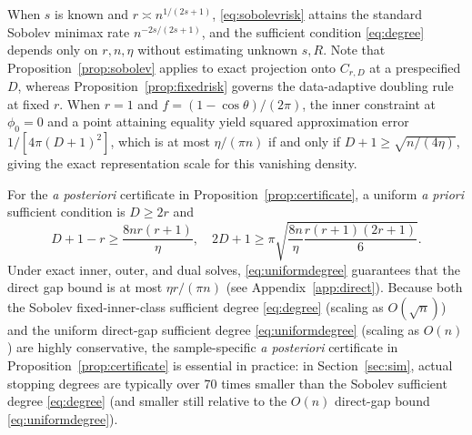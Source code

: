 When \(s\) is known and \(r\asymp n^{1/(2s+1)}\), \eqref{eq:sobolevrisk} attains the standard Sobolev minimax rate \(n^{-2s/(2s+1)}\), and the sufficient condition \eqref{eq:degree} depends only on \(r,n,\eta\) without estimating unknown \(s,R\). Note that Proposition~\ref{prop:sobolev} applies to exact projection onto \(C_{r,D}\) at a prespecified \(D\), whereas Proposition~\ref{prop:fixedrisk} governs the data-adaptive doubling rule at fixed \(r\). When \(r=1\) and \(f=(1-\cos\theta)/(2\pi)\), the inner constraint at \(\phi_0=0\) and a point attaining equality yield squared approximation error \(1/[4\pi(D+1)^2]\), which is at most \(\eta/(\pi n)\) if and only if \(D+1\ge\sqrt{n/(4\eta)}\), giving the exact representation scale for this vanishing density.

For the \emph{a posteriori} certificate in Proposition~\ref{prop:certificate}, a uniform \emph{a priori} sufficient condition is \(D\ge2r\) and
\begin{equation}\label{eq:uniformdegree}
D+1-r\ge\frac{8nr(r+1)}\eta,\quad
2D+1\ge\pi\sqrt{\frac{8n}{\eta}\frac{r(r+1)(2r+1)}6}.
\end{equation}
Under exact inner, outer, and dual solves, \eqref{eq:uniformdegree} guarantees that the direct gap bound is at most \(\eta r/(\pi n)\) (see Appendix~\ref{app:direct}). Because both the Sobolev fixed-inner-class sufficient degree \eqref{eq:degree} (scaling as \(O(\sqrt{n})\)) and the uniform direct-gap sufficient degree \eqref{eq:uniformdegree} (scaling as \(O(n)\)) are highly conservative, the sample-specific \emph{a posteriori} certificate in Proposition~\ref{prop:certificate} is essential in practice: in Section~\ref{sec:sim}, actual stopping degrees are typically over 70 times smaller than the Sobolev sufficient degree \eqref{eq:degree} (and smaller still relative to the \(O(n)\) direct-gap bound \eqref{eq:uniformdegree}).

